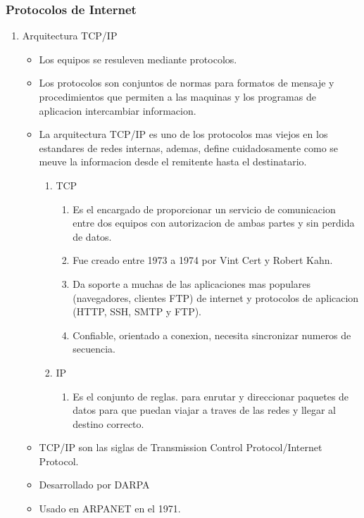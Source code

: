 \documentclass[11pt]{article}
\begin{document}
\subsubsection{Protocolos de Internet}
\label{sec:org8b59a79}
\begin{enumerate}
\item Arquitectura TCP/IP
\label{sec:orgb26ddb8}
\begin{itemize}
\item Los equipos se resuleven mediante protocolos.
\item Los protocolos son conjuntos de normas para formatos de mensaje y procedimientos que permiten a las maquinas y los programas de aplicacion intercambiar informacion.
\item La arquitectura TCP/IP es uno de los protocolos mas viejos en los estandares de redes internas, ademas, define cuidadosamente como se meuve la informacion desde el remitente hasta el destinatario.

\begin{enumerate}
\item TCP
\begin{enumerate}
\item Es el encargado de proporcionar un servicio de comunicacion entre dos equipos con autorizacion de ambas partes y sin perdida de datos.
\item Fue creado entre 1973 a 1974 por Vint Cert y Robert Kahn.
\item Da soporte a muchas de las aplicaciones mas populares (navegadores, clientes FTP) de internet y protocolos de aplicacion (HTTP, SSH, SMTP y FTP).
\item Confiable, orientado a conexion, necesita sincronizar numeros de secuencia.
\end{enumerate}

\item IP
\begin{enumerate}
\item Es el conjunto de reglas. para enrutar y direccionar paquetes de datos para que puedan viajar a traves de las redes y llegar al destino correcto.
\end{enumerate}
\end{enumerate}

\item TCP/IP son las siglas de Transmission Control Protocol/Internet Protocol.
\item Desarrollado por DARPA
\item Usado en ARPANET en el 1971.


\end{itemize}
\end{enumerate}
\end{document}
